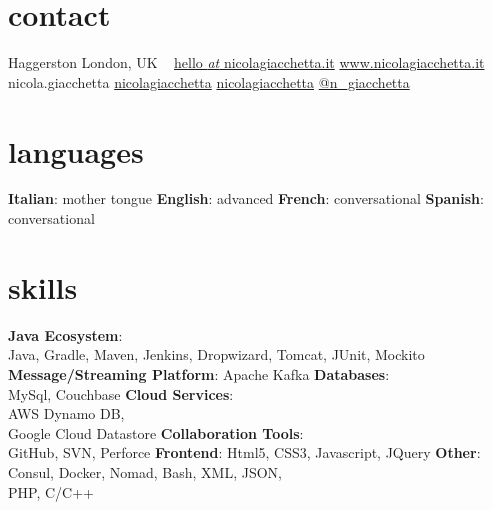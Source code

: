 
\newcommand*{\img}[1]{%
    \raisebox{-.1\baselineskip}{%
        \texttt{[image: \#1]}%
    }%
}



\begin{aside} %
\section{\normalfont contact}
\img{img_tube.png} Haggerston
London, UK
~
\myNumberUK
\href{mailto:\myEmail}{hello {\emph{at}} nicolagiacchetta.it}
\href{http://www.nicolagiacchetta.it/}{www.nicolagiacchetta.it}
\raisebox{-0.4ex}{\skype{}} nicola.giacchetta
 \hspace{0.02cm} \href{https://github.com/nicolagiacchetta}{ nicolagiacchetta}
 \hspace{0.02cm} \href{https://www.linkedin.com/in/nicolagiacchetta}{ nicolagiacchetta}
 \hspace{0.02cm} \href{https://twitter.com/N_Giacchetta}{ @n\_giacchetta}
~
\vspace{-0.1cm}
\section{\normalfont languages}
\textbf{Italian}: mother tongue
\textbf{English}: advanced
\textbf{French}: conversational
\textbf{Spanish}: conversational
~
\vspace{-0.1cm}
\section{\normalfont skills}
\textbf{Java Ecosystem}:\\ Java, Gradle, Maven, Jenkins, Dropwizard, Tomcat, JUnit, Mockito
\textbf{Message/Streaming Platform}: Apache Kafka
\textbf{Databases}:\\ MySql, Couchbase
\textbf{Cloud Services}:\\ AWS Dynamo DB,\\ Google Cloud Datastore
\textbf{Collaboration Tools}:\\ GitHub, SVN, Perforce 
\textbf{Frontend}: Html5, CSS3, Javascript, JQuery
\textbf{Other}: Consul, Docker, Nomad, Bash, XML, JSON,\\ PHP, C/C++ 
~
\vspace{-0.1cm}

\end{aside}
